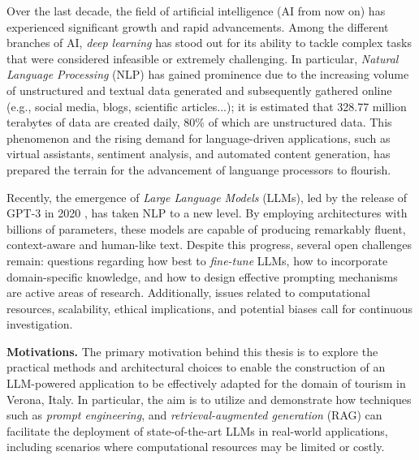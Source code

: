 Over the last decade, the field of artificial intelligence (AI from now on) has experienced significant growth and rapid advancements. Among the different branches of AI, \textit{deep learning} has stood out for its ability to tackle complex tasks that were considered infeasible or extremely challenging. In particular, \textit{Natural Language Processing} (NLP) has gained prominence due to the increasing volume of unstructured and textual data generated and subsequently gathered online (e.g., social media, blogs, scientific articles...); it is estimated that 328.77 million terabytes of data are created daily, 80\% of which are unstructured data. \cite{statista2025} This phenomenon and the rising demand for language-driven applications, such as virtual assistants, sentiment analysis, and automated content generation, has prepared the terrain for the advancement of languange processors to flourish.

Recently, the emergence of \textit{Large Language Models} (LLMs), led by the release of GPT-3 in 2020 \cite{brown2020language}, has taken NLP to a new level. By employing architectures with billions of parameters, these models are capable of producing remarkably fluent, context-aware and human-like text. Despite this progress, several open challenges remain: questions regarding how best to \textit{fine-tune} LLMs, how to incorporate domain-specific knowledge, and how to design effective prompting mechanisms are active areas of research. Additionally, issues related to computational resources, scalability, ethical implications, and potential biases call for continuous investigation.

\textbf{Motivations.} The primary motivation behind this thesis is to explore the practical methods and architectural choices to enable the construction of an LLM-powered application to be effectively adapted for the domain of tourism in Verona, Italy. In particular, the aim is to utilize and demonstrate how techniques such as \textit{prompt engineering}, and \textit{retrieval-augmented generation} (RAG) can facilitate the deployment of state-of-the-art LLMs in real-world applications, including scenarios where computational resources may be limited or costly.

